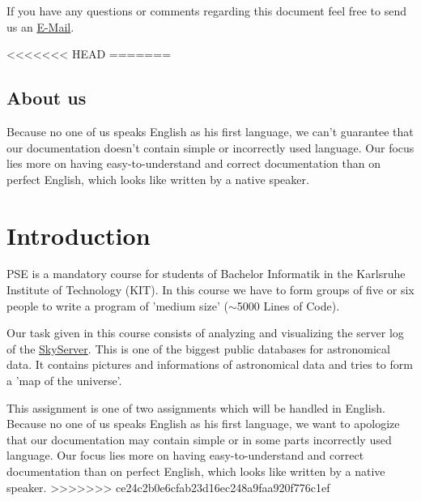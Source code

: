 If you have any questions or comments regarding this document feel free to send us an 
 \href{mailto:pse10-group14-ws12@ira.uni-karlsruhe.de}{E-Mail}.

<<<<<<< HEAD
=======

\subsection*{About us}
Because no one of us speaks English as his first language, 
we can't guarantee that our documentation doesn't contain simple 
or incorrectly used language. Our focus lies more on 
having easy-to-understand and correct documentation 
than on perfect English, which looks like written by a native speaker.

 
\newpage
\section*{Introduction} %
PSE is a mandatory course for students of Bachelor Informatik in the 
Karlsruhe Institute of Technology (KIT).
In this course we have to form groups of five or six people to write
 a program of 'medium size' ($\sim$5000 Lines of Code).

Our task given in this course consists of
analyzing and visualizing the server log of the 
\href{http://skyserver.sdss.org/public/en/}{SkyServer}.
This is one of the biggest public databases for astronomical data. 
It contains pictures and informations of astronomical data
and tries to form a 'map of the universe'.

This assignment is one of two assignments which will be handled 
in English.
Because no one of us speaks English as his first language, 
we want to apologize that our documentation may contain simple 
or in some parts incorrectly used language. Our focus lies more on 
having easy-to-understand and correct documentation 
than on perfect English, which looks like written by a native speaker.
>>>>>>> ce24c2b0e6cfab23d16ec248a9faa920f776c1ef




